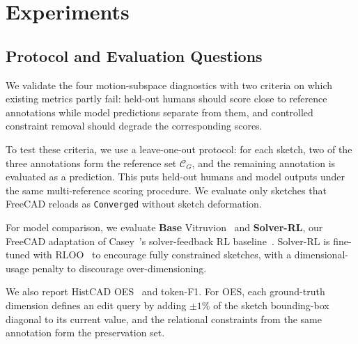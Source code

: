 \section{Experiments}
\label{sec:experiments}

\subsection{Protocol and Evaluation Questions}
\label{sec:exp_setup}

We validate the four motion-subspace diagnostics with two criteria on which existing metrics partly fail: held-out humans should score close to reference annotations while model predictions separate from them, and controlled constraint removal should degrade the corresponding scores.

To test these criteria, we use a leave-one-out protocol: for each sketch, two of the three annotations form the reference set $\mathcal{C}_G$, and the remaining annotation is evaluated as a prediction. This puts held-out humans and model outputs under the same multi-reference scoring procedure. We evaluate only sketches that FreeCAD reloads as \texttt{Converged} without sketch deformation.

For model comparison, we evaluate \textbf{Base} Vitruvion~\cite{seff2021vitruvion} and \textbf{Solver-RL}, our FreeCAD adaptation of Casey~\etal's solver-feedback RL baseline~\cite{casey2025aligning}. Solver-RL is fine-tuned with RLOO~\cite{ahmadian2024back} to encourage fully constrained sketches, with a dimensional-usage penalty to discourage over-dimensioning.

We also report HistCAD OES~\cite{dong2025histcad} and token-F1. For OES, each ground-truth dimension defines an edit query by adding $\pm1\%$ of the sketch bounding-box diagonal to its current value, and the relational constraints from the same annotation form the preservation set.

